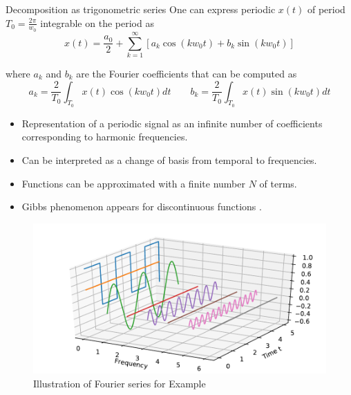   \begin{block}{Decomposition as trigonometric series}
    One can express periodic $x(t)$ of period $T_0=\frac{2\pi}{w_0}$ integrable on the period as
$$
x(t)= \frac{a_0}{2} + \sum_{k=1}^\infty \left [a_k \cos (k w_0 t) +
  b_k \sin (k w_0 t) \right]
$$

where $a_k$ and $b_k$ are the Fourier coefficients that can be computed as
$$
a_k = \frac{2}{T_0} \int_{T_0} x(t) \cos (k w_0 t) dt \quad \quad b_k
= \frac{2}{T_0} \int_{T_0} x(t) \sin (k w_0 t) dt
$$

\begin{itemize}
  \item Representation of a periodic signal as an infinite number of coefficients corresponding to harmonic frequencies.
  \item Can be interpreted as a change of basis from temporal to frequencies.
  \item Functions can be approximated with a finite number $N$ of terms.
  \item Gibbs phenomenon appears for discontinuous functions \cite{hewitt1979gibbs}.
\end{itemize}

\end{block}


\begin{figure}[t]
    \centering
    \includegraphics[width=.64\linewidth]{imgs/fourier/fourier_series_3d}
    \caption{Illustration of Fourier series for Example }
    \label{fig:label}
\end{figure}

